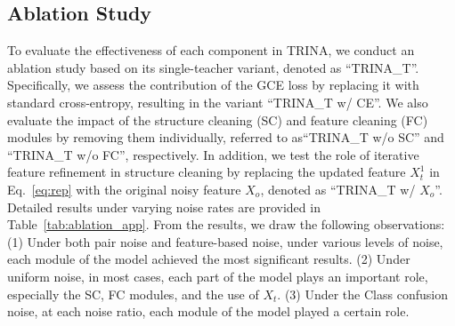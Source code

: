\documentclass[sigconf, anonymous, review]{acmart}
\begin{document}
  \subsection{Ablation Study}
    To evaluate the effectiveness of each component in TRINA, we conduct an ablation study based on its single-teacher variant, denoted as ``TRINA\_T''.  Specifically, we assess the contribution of the GCE loss by replacing it with standard cross-entropy, resulting in the variant ``TRINA\_T w/ CE''. We also evaluate the impact of the structure cleaning (SC) and feature cleaning (FC) modules by removing them individually, referred to as``TRINA\_T w/o SC'' and  ``TRINA\_T w/o FC'', respectively.  In addition, we test the role of iterative feature refinement in structure cleaning by replacing the updated feature $X_t^1$ in Eq.~\ref{eq:rep} with the original noisy feature $X_o$, denoted as ``TRINA\_T w/ $X_o$''.
    Detailed results under varying noise rates are provided in Table~\ref{tab:ablation_app}. From the results, we draw the following observations:
    (1) Under both pair noise and feature-based noise, under various levels of noise, each module of the model achieved the most significant results.
    (2) Under uniform noise, in most cases, each part of the model plays an important role, especially the SC, FC modules, and the use of $X_t$.
    (3) Under the Class confusion noise, at each noise ratio, each module of the model played a certain role.
\end{document}
